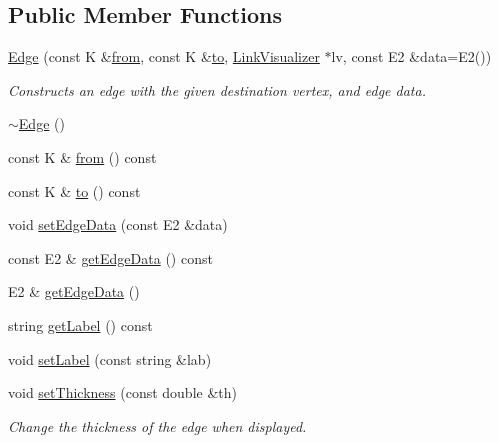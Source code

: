 \subsection*{Public Member Functions}
\begin{DoxyCompactItemize}
\item 
\hyperlink{classbridges_1_1datastructure_1_1_edge_aae44cef647b20d260b449a5fb041ae95}{Edge} (const K \&\hyperlink{classbridges_1_1datastructure_1_1_edge_a0fba8af11c12f73c993f6e8a573daa02}{from}, const K \&\hyperlink{classbridges_1_1datastructure_1_1_edge_a2cece2762a29e3fc18859e0c725eee82}{to}, \hyperlink{classbridges_1_1datastructure_1_1_link_visualizer}{Link\+Visualizer} $\ast$lv, const E2 \&data=E2())
\begin{DoxyCompactList}\small\item\em Constructs an edge with the given destination vertex, and edge data. \end{DoxyCompactList}\item 
\hyperlink{classbridges_1_1datastructure_1_1_edge_a7160632622b92c93036cd6fdcec75959}{$\sim$\+Edge} ()
\item 
const K \& \hyperlink{classbridges_1_1datastructure_1_1_edge_a0fba8af11c12f73c993f6e8a573daa02}{from} () const
\item 
const K \& \hyperlink{classbridges_1_1datastructure_1_1_edge_a2cece2762a29e3fc18859e0c725eee82}{to} () const
\item 
void \hyperlink{classbridges_1_1datastructure_1_1_edge_a8f030413780f15f90141e4ff29240ec0}{set\+Edge\+Data} (const E2 \&data)
\item 
const E2 \& \hyperlink{classbridges_1_1datastructure_1_1_edge_a4769b5d8fc74522f77f5927b230ced7b}{get\+Edge\+Data} () const
\item 
E2 \& \hyperlink{classbridges_1_1datastructure_1_1_edge_a302b605a5d30387cfae8f4805c43ec41}{get\+Edge\+Data} ()
\item 
string \hyperlink{classbridges_1_1datastructure_1_1_edge_aad4a9a28e282e5aa5e7821a14ef94327}{get\+Label} () const
\item 
void \hyperlink{classbridges_1_1datastructure_1_1_edge_a5f88c4db54027da70de06f21fd5b6ccd}{set\+Label} (const string \&lab)
\item 
void \hyperlink{classbridges_1_1datastructure_1_1_edge_adf4a6a3974e1fc60331f4b9d33c7b0e5}{set\+Thickness} (const double \&th)
\begin{DoxyCompactList}\small\item\em Change the thickness of the edge when displayed. \end{DoxyCompactList}\item 

\end{DoxyCompactItemize}

